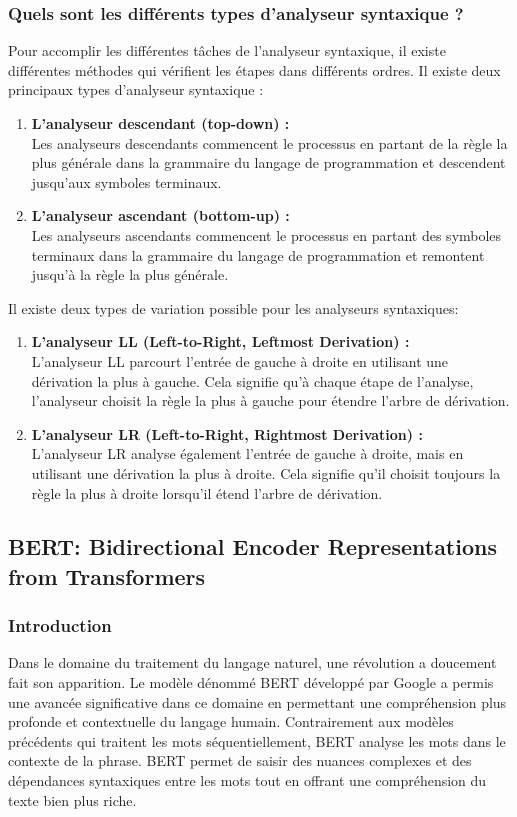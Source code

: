 \documentclass{rapport}
\begin{document}
\subsubsection{Quels sont les différents types d'analyseur syntaxique ?}
Pour accomplir les différentes tâches de l'analyseur syntaxique, il existe différentes méthodes qui vérifient les étapes dans différents ordres. Il existe deux principaux types d'analyseur syntaxique :
\begin{enumerate}
    \item \textbf{L'analyseur descendant (top-down) :}\\
    Les analyseurs descendants commencent le processus en partant de la règle la plus générale dans la grammaire du langage de programmation et descendent jusqu'aux symboles terminaux.
    \item \textbf{L'analyseur ascendant (bottom-up) :}\\
    Les analyseurs ascendants commencent le processus en partant des symboles terminaux dans la grammaire du langage de programmation et remontent jusqu'à la règle la plus générale.
\end{enumerate}

Il existe deux types de variation possible pour les analyseurs syntaxiques:
\begin{enumerate}
    \item \textbf{L'analyseur LL (Left-to-Right, Leftmost Derivation) :}\\
    L'analyseur LL parcourt l'entrée de gauche à droite en utilisant une dérivation la plus à gauche. Cela signifie qu'à chaque étape de l'analyse, l'analyseur choisit la règle la plus à gauche pour étendre l'arbre de dérivation.
    \item \textbf{L'analyseur LR (Left-to-Right, Rightmost Derivation) :}\\
     L'analyseur LR analyse également l'entrée de gauche à droite, mais en utilisant une dérivation la plus à droite. Cela signifie qu'il choisit toujours la règle la plus à droite lorsqu'il étend l'arbre de dérivation.
\end{enumerate}
\newpage
\subsection{BERT: Bidirectional Encoder Representations from Transformers}
\label{subsec:LLM}
\subsubsection{Introduction}
Dans le domaine du traitement du langage naturel, une révolution a doucement fait son apparition. Le modèle dénommé BERT développé par Google a permis une avancée significative dans ce domaine en permettant une compréhension plus profonde et contextuelle du langage humain. Contrairement aux modèles précédents qui traitent les mots séquentiellement, BERT analyse les mots dans le contexte de la phrase. BERT permet de saisir des nuances complexes et des dépendances syntaxiques entre les mots tout en offrant une compréhension du texte bien plus riche.
\end{document}
